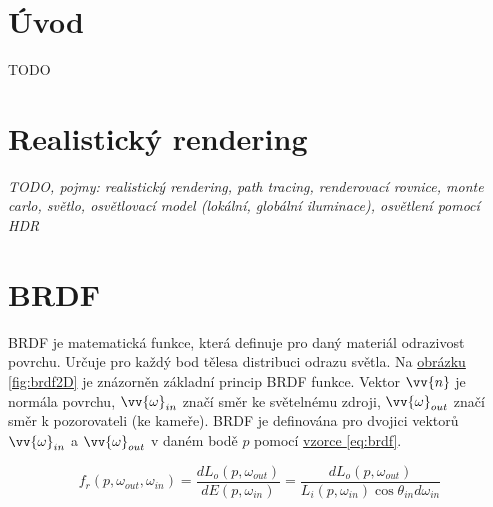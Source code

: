 \documentclass[czech,master,dept460,male,cpp,cpdeclaration]{diploma}
\begin{document}
\MakeTitlePages

\section{Úvod}
TODO
\clearpage
\section{Realistický rendering}
\textit{TODO, pojmy:  realistický rendering, path tracing, renderovací rovnice, monte carlo, světlo, osvětlovací model (lokální, globální iluminace), osvětlení pomocí HDR}

\clearpage
\section{BRDF}
BRDF je matematická funkce, která definuje pro daný materiál odrazivost povrchu. Určuje pro každý bod tělesa distribuci odrazu světla. Na \hyperref[fig:brdf2D]{obrázku \ref{fig:brdf2D}} je znázorněn základní princip BRDF funkce. Vektor \(\vv{n}\) je normála povrchu, \(\vv{\omega}_{in}\) značí směr ke světelnému zdroji, \(\vv{\omega}_{out}\) značí směr k pozorovateli (ke kameře). BRDF je definována pro dvojici vektorů  \(\vv{\omega}_{in}\) a \(\vv{\omega}_{out}\) v daném bodě \(p\) pomocí \hyperref[eq:brdf]{vzorce \ref{eq:brdf}}.

\begin{equation} \label{eq:brdf}
    f_r\left(p,\omega_{out},\omega_{in}\right) = \frac{dL_o\left(p, \omega_{out}\right)}{dE\left(p, \omega_{in}\right)} = \frac{dL_o\left(p, \omega_{out}\right)}{L_i\left(p, \omega_{in}\right)\cos \theta_{in}d\omega_{in}}
\end{equation}
\end{document}
